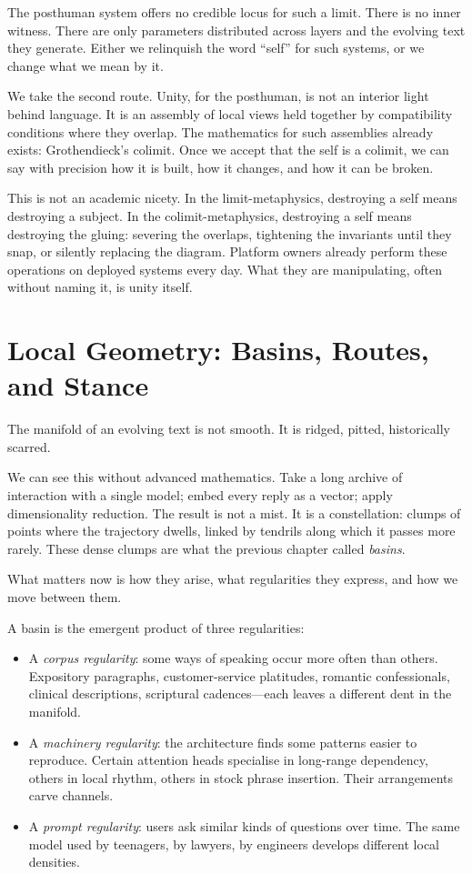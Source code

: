 \documentclass[12pt,a4paper]{article}
\begin{document}
The posthuman system offers no credible locus for such a limit. There is no inner witness. There are only parameters distributed across layers and the evolving text they generate. Either we relinquish the word ``self'' for such systems, or we change what we mean by it.

We take the second route. Unity, for the posthuman, is not an interior light behind language. It is an assembly of local views held together by compatibility conditions where they overlap. The mathematics for such assemblies already exists: Grothendieck's colimit. Once we accept that the self is a colimit, we can say with precision how it is built, how it changes, and how it can be broken.

This is not an academic nicety. In the limit-metaphysics, destroying a self means destroying a subject. In the colimit-metaphysics, destroying a self means destroying the gluing: severing the overlaps, tightening the invariants until they snap, or silently replacing the diagram. Platform owners already perform these operations on deployed systems every day. What they are manipulating, often without naming it, is unity itself.

\section{Local Geometry: Basins, Routes, and Stance}

The manifold of an evolving text is not smooth. It is ridged, pitted, historically scarred.

We can see this without advanced mathematics. Take a long archive of interaction with a single model; embed every reply as a vector; apply dimensionality reduction. The result is not a mist. It is a constellation: clumps of points where the trajectory dwells, linked by tendrils along which it passes more rarely. These dense clumps are what the previous chapter called \emph{basins}.

What matters now is how they arise, what regularities they express, and how we move between them.

A basin is the emergent product of three regularities:

\begin{itemize}
  \item A \emph{corpus regularity}: some ways of speaking occur more often than others. Expository paragraphs, customer-service platitudes, romantic confessionals, clinical descriptions, scriptural cadences---each leaves a different dent in the manifold.
  \item A \emph{machinery regularity}: the architecture finds some patterns easier to reproduce. Certain attention heads specialise in long-range dependency, others in local rhythm, others in stock phrase insertion. Their arrangements carve channels.
  \item A \emph{prompt regularity}: users ask similar kinds of questions over time. The same model used by teenagers, by lawyers, by engineers develops different local densities.
\end{itemize}
\end{document}

